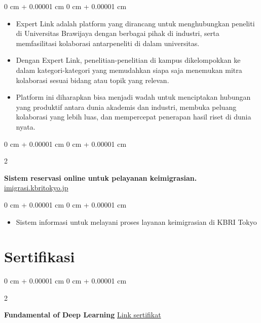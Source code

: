 \documentclass[10pt, letterpaper]{article}
\newenvironment{highlights}{
    \begin{itemize}[
        topsep=0.10 cm,
        parsep=0.10 cm,
        partopsep=0pt,
        itemsep=0pt,
        leftmargin=0 cm + 10pt
    ]
}{
    \end{itemize}
} %
\newenvironment{onecolentry}{
    \begin{adjustwidth}{
        0 cm + 0.00001 cm
    }{
        0 cm + 0.00001 cm
    }
}{
    \end{adjustwidth}
} %
\newenvironment{twocolentry}[2][]{
    \onecolentry
    \def\secondColumn{#2}
    \setcolumnwidth{\fill, 4.5 cm}
    \begin{paracol}{2}
}{
    \switchcolumn \raggedleft \secondColumn
    \end{paracol}
    \endonecolentry
} %
\begin{document}
        \vspace{0.10 cm}
        \begin{onecolentry}
            \begin{highlights}
                \item Expert Link adalah platform yang dirancang untuk menghubungkan peneliti di Universitas Brawijaya dengan berbagai pihak di industri, serta memfasilitasi kolaborasi antarpeneliti di dalam universitas.

                \item Dengan Expert Link, penelitian-penelitian di kampus dikelompokkan ke dalam kategori-kategori yang memudahkan siapa saja menemukan mitra kolaborasi sesuai bidang atau topik yang relevan.

                \item Platform ini diharapkan bisa menjadi wadah untuk menciptakan hubungan yang produktif antara dunia akademis dan industri, membuka peluang kolaborasi yang lebih luas, dan mempercepat penerapan hasil riset di dunia nyata.

            \end{highlights}
        \end{onecolentry}

        \vspace{0.2 cm}

        
        \begin{twocolentry}{
            \href{https://imigrasi.kbritokyo.jp/}{imigrasi.kbritokyo.jp}
        }
            \textbf{Sistem reservasi online untuk pelayanan keimigrasian.}\end{twocolentry}

        \vspace{0.10 cm}
        \begin{onecolentry}
            \begin{highlights}
                \item Sistem informasi untuk melayani proses layanan keimigrasian di KBRI Tokyo 
            \end{highlights}
        \end{onecolentry}

        \vspace{0.2 cm}


    \section{Sertifikasi}
        \begin{twocolentry}{
            \href{https://learn.nvidia.com/certificates?id=12ff9f3ec3ff400ea10e5421aae1acd9}{Link sertifikat}
        }
            \textbf{
Fundamental of Deep Learning}\end{twocolentry}
\end{document}
